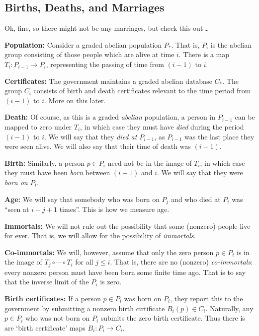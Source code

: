 \documentclass[11pt]{article}
\newcommand{\myheading}[1]
{{\noindent\Large #1}

}
\renewcommand{\myheading}[1]{\subsection{#1}}
\begin{document}
\myheading{Births, Deaths, and Marriages}
\begin{Births Deaths and Marriages}
Ok, fine, so there might not be any marriages, but check this out\,\ldots

\Bullet \textbf{Population:} Consider a graded abelian population $P_*$. That
is, $P_i$ is the abelian group consisting of those people which are alive at
time $i$. There is a map $T_{i}:P_{i-1}\to P_{i}$, representing the passing of
time from $(i-1)$ to $i$.

\Bullet \textbf{Certificates:} The government maintains a graded abelian
database $C_*$. The group $C_i$ consists of birth and death certificates
relevant to the time period from $(i-1)$ to $i$. More on this later.

\Bullet \textbf{Death:} Of course, as this is a graded \emph{abelian}
population, a person in $P_{i-1}$ can be mapped to zero under $T_{i}$, in which
case they must have \emph{died} during the period $(i-1)$ to $i$. We will say
that they \emph{died at $P_{i-1}$}, as $P_{i-1}$ was the last place they were
seen alive. We will also say that their time of death was $(i-1)$.

\Bullet \textbf{Birth:} Similarly, a person $p\in P_i$ need not be in the image
of $T_{i}$, in which case they must have been \emph{born} between $(i-1)$ and
$i$. We will say that they were \emph{born on $P_i$}.

\Bullet \textbf{Age:} We will say that somebody who was born on $P_j$ and who
died at $P_i$ was ``seen at $i-j+1$ times''. This is how we measure age.

\Bullet \textbf{Immortals:} We will not rule out the possibility that some
(nonzero) people live for ever. That is, we will allow for the possibility of
\emph{immortals}.

\Bullet \textbf{Co-immortals:} We will, however, assume that only the zero
person $p\in P_i$ is in the image of $T_{j}\circ\cdots\circ T_i$ for all $j\leq
i$. That is, there are no (nonzero) \emph{co-immortals}: every nonzero person
must have been born some finite time ago. That is to say that the inverse limit
of the $P_i$ is zero.

\Bullet \textbf{Birth certificates:} If a person $p\in P_{i}$ was born on $P_i$,
they report this to the government by submitting a nonzero birth cirtificate
$B_{i}(p)\in C_i$. Naturally, any $p\in P_{i}$ who was not born on $P_i$ submits
the zero birth certificate. Thus there is are `birth certificate' maps
$B_i:P_i\to C_i$.


\end{Births Deaths and Marriages}
\end{document}
